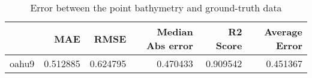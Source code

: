 \begin{table}[h!]
\centering
\caption{Error between the point bathymetry and ground-truth data}
\label{tab:oahu9_lidar_error}
\begin{tabular}{lrrrrr}
\toprule
 & MAE & RMSE & Median Abs error & R2 Score & Average Error \\
\midrule
oahu9 & 0.512885 & 0.624795 & 0.470433 & 0.909542 & 0.451367 \\
\bottomrule
\end{tabular}
\end{table}
